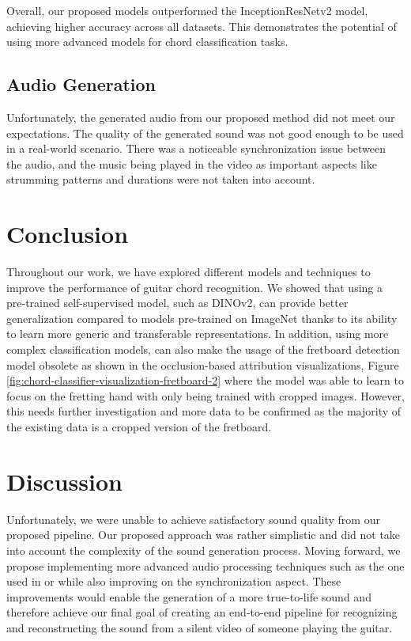 \documentclass[10pt,twocolumn,letterpaper]{article}
\begin{document}
Overall, our proposed models outperformed the InceptionResNetv2 model, achieving higher accuracy across all datasets. This demonstrates the potential of using more advanced models for chord classification tasks.

\subsection{Audio Generation}
Unfortunately, the generated audio from our proposed method did not meet our expectations. The quality of the generated sound was not good enough to be used in a real-world scenario. There was a noticeable synchronization issue between the audio, and the music being played in the video as important aspects like strumming patterns and durations were not taken into account.

\section{Conclusion}
Throughout our work, we have explored different models and techniques to improve the performance of guitar chord recognition.  We showed that using a pre-trained self-supervised model, such as DINOv2, can provide better generalization compared to models pre-trained on ImageNet thanks to its ability to learn more generic and transferable representations. In addition, using more complex classification models, can also make the usage of the fretboard detection model obsolete as shown in the occlusion-based attribution visualizations, Figure \ref{fig:chord-classifier-visualization-fretboard-2} where the model was able to learn to focus on the fretting hand with only being trained with cropped images. However, this needs further investigation and more data to be confirmed as the majority of the existing data is a cropped version of the fretboard.

\section{Discussion}
Unfortunately, we were unable to achieve satisfactory sound quality from our proposed pipeline. Our proposed approach was rather simplistic and did not take into account the complexity of the sound generation process. Moving forward, we propose implementing more advanced audio processing techniques such as the one used in \cite{su2020audeo} or \cite{li2023melodydiffusion} while also improving on the synchronization aspect. These improvements would enable the generation of a more true-to-life sound and therefore achieve our final goal of creating an end-to-end pipeline for recognizing and reconstructing the sound from a silent video of someone playing the guitar.

    {\small
        
        
    }
\end{document}
